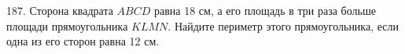 187. Сторона квадрата $ABCD$ равна 18 см, а его площадь в три раза больше площади прямоугольника $KLMN.$ Найдите периметр этого прямоугольника, если одна из его сторон равна 12 см.\\
